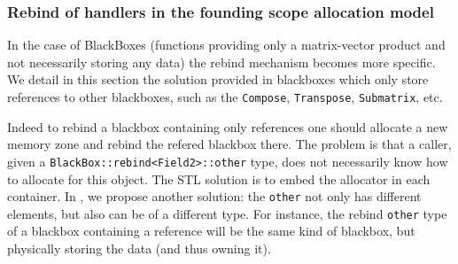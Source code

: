 \subsubsection{Rebind of handlers in the founding scope allocation model}
In the case of BlackBoxes (functions providing only a matrix-vector
product and not necessarily storing any data) the rebind mechanism
becomes more specific. We detail in this section the solution provided
in blackboxes which only store references to other blackboxes, such as
the \texttt{Compose}, \texttt{Transpose}, \texttt{Submatrix}, etc.

Indeed to rebind a blackbox containing only references one should
allocate a new memory zone and rebind the refered blackbox there.
The problem is that a caller, given a \texttt{BlackBox::rebind<Field2>::other}
type, does not necessarily know how to allocate for this object. 
The STL solution is to embed the allocator in each container. 
In \linbox, we propose another solution: the \texttt{other} not only
has different elements, but also can be of a different type.
For instance, the rebind \texttt{other} type of a blackbox containing
a reference will be the same kind of blackbox, but physically storing
the data (and thus owning it). 

